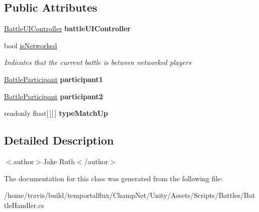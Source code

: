 \subsection*{Public Attributes}
\begin{DoxyCompactItemize}
\item 
\hypertarget{group__client_gad57da165c3aa4c3906b10dc80cca73e2}{\hyperlink{class_battle_u_i_controller}{Battle\-U\-I\-Controller} {\bfseries battle\-U\-I\-Controller}}\label{group__client_gad57da165c3aa4c3906b10dc80cca73e2}

\item 
bool \hyperlink{group__client_ga91faa80b5273370273762c40a364305d}{is\-Networked}
\begin{DoxyCompactList}\small\item\em Indicates that the current battle is between networked players \end{DoxyCompactList}\item 
\hypertarget{group__client_ga95fc9651e0a7845913c3a2bf1330e2cf}{\hyperlink{class_battle_participant}{Battle\-Participant} {\bfseries participant1}}\label{group__client_ga95fc9651e0a7845913c3a2bf1330e2cf}

\item 
\hypertarget{group__client_ga303ed561d4ed9408dfb02b03034ed2a9}{\hyperlink{class_battle_participant}{Battle\-Participant} {\bfseries participant2}}\label{group__client_ga303ed561d4ed9408dfb02b03034ed2a9}

\item 
readonly float\mbox{[}$\,$\mbox{]}\mbox{[}$\,$\mbox{]} {\bfseries type\-Match\-Up}
\end{DoxyCompactItemize}


\subsection{Detailed Description}


$<$author$>$Jake Ruth$<$/author$>$ 

The documentation for this class was generated from the following file\-:\begin{DoxyCompactItemize}
\item 
/home/travis/build/temportalflux/\-Champ\-Net/\-Unity/\-Assets/\-Scripts/\-Battles/Battle\-Handler.\-cs\end{DoxyCompactItemize}

